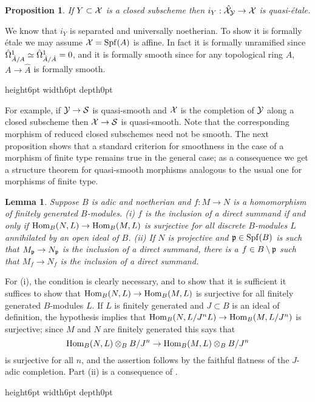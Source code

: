\documentclass{article}
\theoremstyle{change}
\newtheorem{prop}[subsubsection]{Proposition}
\newtheorem{lemma}[subsubsection]{Lemma}
\numberwithin{equation}{subsubsection}
\newcommand{\demobox}{\vrule height6pt width6pt depth0pt}
\newenvironment{demo}{\noindent{\it Proof.}}
{{\unskip\nobreak\hfil\qquad
\demobox\parfillskip=0pt\par}
\medskip}
\begin{document}
\begin{prop}
  If $Y\subset{\cal X}$ is a closed subscheme then $i_Y:\hat{{\cal X}}_{\cal Y}\to{\cal X}$
  is quasi-\'etale.
\end{prop}
\begin{demo}
  We know that $i_Y$ is separated and universally noetherian. To show
  it is formally \'etale we may assume ${\cal X}={\operatorname{Spf}({A})}$ is affine. In
  fact it is formally unramified since
  $\hat\Omega^1_{\hat A/A}\simeq\hat\Omega^1_{\hat A/\hat A}=0$, and it is
  formally smooth since for any topological ring $A$, $A\to\hat A$ is
  formally smooth.
\end{demo}

For example, if ${\cal Y}\to{\cal S}$ is quasi-smooth and ${\cal X}$ is the
completion of ${\cal Y}$ along a closed subscheme then ${\cal X}\to{\cal S}$ is
quasi-smooth. Note that the corresponding morphism of reduced closed
subschemes need not be smooth. The next proposition shows that a
standard criterion for smoothness in the case of a morphism of finite
type remains true in the general case; as a consequence we get a
structure theorem for quasi-smooth morphisms analogous to the usual
one for morphisms of finite type.

\begin{lemma}\label{lemma:local-direct-factor}
  Suppose $B$ is adic and noetherian and $f:M\to N$ is a homomorphism
  of finitely generated $B$-modules. (i) $f$ is the inclusion of a
  direct summand if and only if ${\operatorname{Hom}}_B(N,L)\to{\operatorname{Hom}}_B(M,L)$ is
  surjective for all discrete $B$-modules $L$ annihilated by an open
  ideal of $B$. (ii) If $N$ is projective and ${\mathfrak p}\in{\operatorname{Spf}({B})}$ is such
  that $M_{\mathfrak p}\to N_{\mathfrak p}$ is the inclusion of a direct summand, there is
  a $f\in B\setminus{\mathfrak p}$ such that $M_f\to N_f$ is the inclusion of a
  direct summand.
\end{lemma}
\begin{demo}
  For (i), the condition is clearly necessary, and to show that it is
  sufficient it suffices to show that ${\operatorname{Hom}}_B(N,L)\to{\operatorname{Hom}}_B(M,L)$ is
  surjective for all finitely generated $B$-modules $L$. If $L$ is
  finitely generated and $J\subset B$ is an ideal of definition, the
  hypothesis implies that ${\operatorname{Hom}}_B(N,L/J^nL)\to{\operatorname{Hom}}_B(M,L/J^n)$ is
  surjective; since $M$ and $N$ are finitely generated this says that
  \begin{displaymath}
    {\operatorname{Hom}}_B(N,L)\otimes_BB/J^n\to{\operatorname{Hom}}_B(M,L)\otimes_BB/J^n
  \end{displaymath}
  is surjective for all $n$, and the assertion follows by the faithful
  flatness of the $J$-adic completion. Part (ii) is a consequence of
  \cite[Cor. 19.1.12]{EGA}.
\end{demo}
\end{document}
